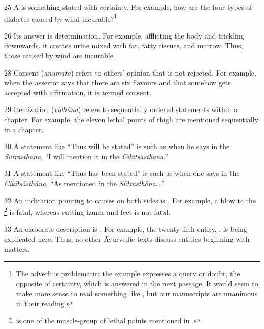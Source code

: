 \begin{translation}
\item [25]  A  is something stated
with certainty.  For example, how are the four types of diabetes caused
by wind incurable?\footnote{The adverb  is problematic:
    the example expresses a query or doubt, the opposite of certainty, which
    is answered in the next passage.  It would seem to make more sense to
    read something like ,
    but our manuscripts are unanimous in their reading.}

\item [26] Its answer is determination. For example, afflicting the body and 
trickling downwards, it creates urine mixed with fat, fatty tissues, and 
marrow. Thus, those caused by wind are incurable. 

\item [28]  Consent (\emph{anumata}) refers to 
others' opinion that is not 
rejected. For example, when the assertor says that there are six flavours and 
that somehow gets accepted with affirmation, it is termed consent.

\item [29] Itemization (\emph{vidhāna}) refers to 
sequentially ordered 
statements within a chapter. For example, the eleven lethal points of thigh are 
mentioned sequentially in a chapter.

\item [30] A statement like “Thus will be stated” is  such as when he says in the \emph{Sūtrasthāna}, “I will mention it in 
the \emph{Cikitsāsthāna}.” 

\item [31] A statement like “Thus has been stated” is 
 such as when one says in the 
\emph{Cikitsāsthāna}, “As mentioned in the \emph{Sūtrasthāna}\ldots.” 

\item [32] An indication pointing to causes on both sides is
. For example, a blow to the
\footnote{ is one of the
    muscle-group of lethal points mentioned in .}  is fatal,
    whereas cutting hands and feet is not fatal.

\item [33] An elaborate description is . For 
example, 
the twenty-fifth entity, , is being explicated here. Thus, no 
other Āyurvedic texts discuss  entities beginning with matters. 


\end{translation}
